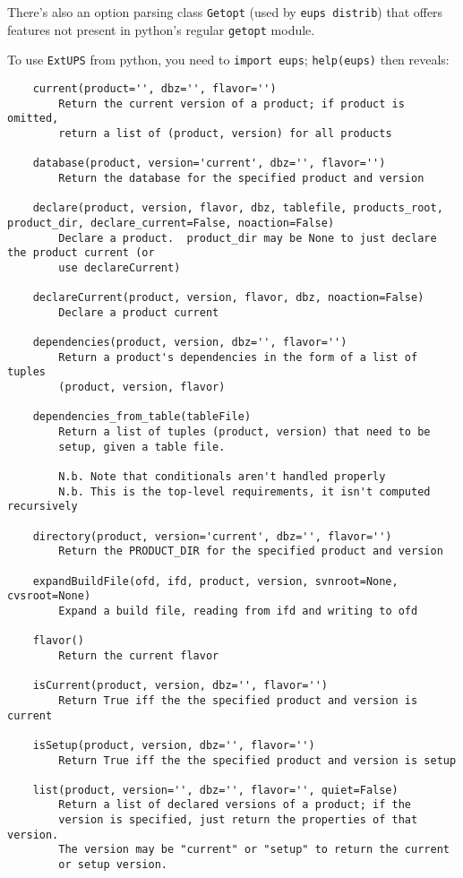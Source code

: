\documentclass{article}
\newcommand{\code}[1]{\texttt{#1}}
\newcommand{\eups}{\code{ExtUPS}}
\begin{document}
There's also an option parsing class \code{Getopt} (used by \code{eups distrib}) that
offers features not present in python's regular \code{getopt} module.

To use \eups{} from python, you need to \code{import eups};
\code{help(eups)} then reveals:
\begin{verbatim}
    current(product='', dbz='', flavor='')
        Return the current version of a product; if product is omitted,
        return a list of (product, version) for all products
    
    database(product, version='current', dbz='', flavor='')
        Return the database for the specified product and version
    
    declare(product, version, flavor, dbz, tablefile, products_root, product_dir, declare_current=False, noaction=False)
        Declare a product.  product_dir may be None to just declare the product current (or
        use declareCurrent)
    
    declareCurrent(product, version, flavor, dbz, noaction=False)
        Declare a product current
    
    dependencies(product, version, dbz='', flavor='')
        Return a product's dependencies in the form of a list of tuples
        (product, version, flavor)
    
    dependencies_from_table(tableFile)
        Return a list of tuples (product, version) that need to be
        setup, given a table file.
        
        N.b. Note that conditionals aren't handled properly
        N.b. This is the top-level requirements, it isn't computed recursively
    
    directory(product, version='current', dbz='', flavor='')
        Return the PRODUCT_DIR for the specified product and version
    
    expandBuildFile(ofd, ifd, product, version, svnroot=None, cvsroot=None)
        Expand a build file, reading from ifd and writing to ofd
    
    flavor()
        Return the current flavor
    
    isCurrent(product, version, dbz='', flavor='')
        Return True iff the the specified product and version is current
    
    isSetup(product, version, dbz='', flavor='')
        Return True iff the the specified product and version is setup
    
    list(product, version='', dbz='', flavor='', quiet=False)
        Return a list of declared versions of a product; if the
        version is specified, just return the properties of that version.
        The version may be "current" or "setup" to return the current
        or setup version.
        

\end{verbatim}
\end{document}
